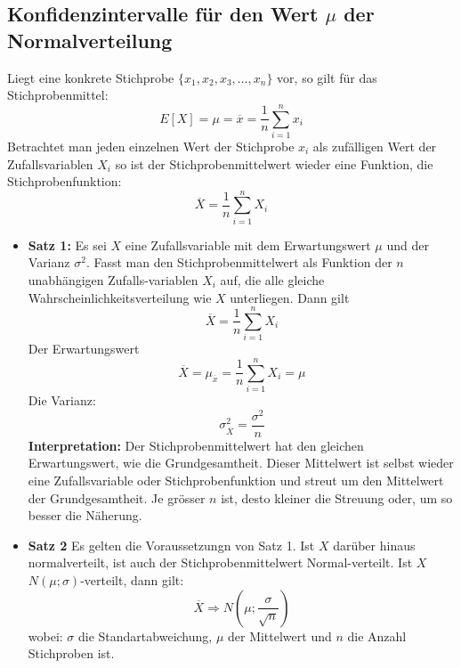 \subsection{Konfidenzintervalle für den Wert $\mu$ der Normalverteilung}
Liegt eine konkrete Stichprobe $\{x_1,x_2,x_3,\ldots,x_n\}$ vor, so gilt für das Stichprobenmittel:
\begin{equation}
E[X] = \mu = \overline{x} = \frac{1}{n}\sum_{i=1}^n x_i
\end{equation}
Betrachtet man jeden einzelnen Wert der Stichprobe $x_i$ als zufälligen Wert der Zufallsvariablen $X_i$ so ist der Stichprobenmittelwert wieder eine Funktion, die Stichprobenfunktion: 
\begin{equation}
\overline{X}=\frac{1}{n}\sum_{i=1}^n X_i
\end{equation}
\begin{itemize}
	\item \textbf{Satz 1:} Es sei $X$ eine Zufallsvariable mit dem Erwartungswert $\mu$ und der Varianz $\sigma^2$. Fasst man den Stichprobenmittelwert als Funktion der $n$ unabhängigen Zufalls-variablen $X_i$ auf, die alle gleiche Wahrscheinlichkeitsverteilung wie $X$ unterliegen. Dann gilt
	\begin{equation}
	\overline{X}=\frac{1}{n}\sum_{i=1}^n X_i
	\end{equation}
		\subitem Der Erwartungswert
		\begin{equation}
		\overline{X} = \mu_{\overline{x}}=\frac{1}{n}\sum_{i=1}^n X_i = \mu
		\end{equation}
		\subitem Die Varianz:
		\begin{equation}
		\sigma^2_{\overline{X}}=\frac{\sigma^2}{n}
		\end{equation}
		\subitem \textbf{Interpretation: }Der Stichprobenmittelwert hat den gleichen Erwartungswert, wie die Grundgesamtheit. Dieser Mittelwert ist selbst wieder eine Zufallsvariable oder Stichprobenfunktion und streut um den Mittelwert der Grundgesamtheit. Je grösser $n$ ist, desto kleiner die Streuung oder, um so besser die Näherung.
	\item \textbf{Satz 2} Es gelten die Voraussetzungn von Satz 1. Ist $X$ darüber hinaus normalverteilt, ist auch der Stichprobenmittelwert Normal-verteilt. Ist $X$ $N(\mu;\sigma)$-verteilt, dann gilt:
	\begin{equation}
	\overline{X}\Rightarrow N(\mu ; \frac{\sigma}{\sqrt{n}})
	\end{equation}
	wobei: $\sigma$ die Standartabweichung, $\mu$ der Mittelwert und $n$ die Anzahl Stichproben ist.
\end{itemize}